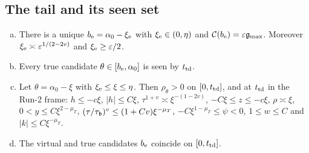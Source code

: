 \subsection{The tail and its seen set}\label{app:B-tail}

\begin{lemma}[Tail]\label{lem:B-tail}
\begin{enumerate}[(a)]\setlength{\itemsep}{1pt}
\item There is a unique $b_{\mathrm{e}}=\alpha_0-\xi_{\mathrm{e}}$ with $\xi_{\mathrm{e}}\in(0,\eta)$ and $\mathcal C(b_{\mathrm{e}})=\varepsilon\mathfrak{g}_{\max}$. Moreover
$\xi_{\mathrm{e}}\asymp\varepsilon^{1/(2-2v)}$ and $\xi_{\mathrm{e}}\ge\varepsilon/2$.
\item Every true candidate $\theta\in[b_{\mathrm{e}},\alpha_0]$ is seen by $t_{\mathrm{td}}$.
\item Let $\theta=\alpha_0-\xi$ with $\xi_{\mathrm{e}}\le\xi\le\eta$. Then $\rho_\theta>0$ on $[0,t_{\mathrm{td}}]$, and at $t_{\mathrm{td}}$ in the Run-2 frame:
$h\le-c\xi$, $|h|\le C\xi$, $\tau^{1+v}\asymp\xi^{-(1-2v)}$, $-C\xi\le z\le-c\xi$, $\rho\asymp\xi$, $0<y\le C\xi^{2-\mu_T}$,
$(\tau/\tau_{\mathfrak{b}})^v\le(1+Cv)\xi^{-\mu_T}$, $-C\xi^{1-\mu_T}\le\psi<0$, $1\le w\le C$ and $|k|\le C\xi^{-\mu_T}$.
\item The virtual and true candidates $b_{\mathrm{e}}$ coincide on $[0,t_{\mathrm{td}}]$.
\end{enumerate}
\end{lemma}
